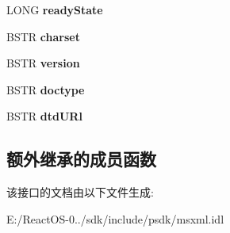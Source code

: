 \begin{DoxyCompactItemize}
L\+O\+NG {\bfseries ready\+State}
\item 
\mbox{\label{interface_m_s_x_m_l_1_1_i_x_m_l_document_a7550babe7d52c2520d53f46e83e7cd21}} 
B\+S\+TR {\bfseries charset}
\item 
\mbox{\label{interface_m_s_x_m_l_1_1_i_x_m_l_document_a944b38dd1867538e5f9d8aded8b349e1}} 
B\+S\+TR {\bfseries version}
\item 
\mbox{\label{interface_m_s_x_m_l_1_1_i_x_m_l_document_ace7ecc9c0bf769b0cdf8c7e65481d55e}} 
B\+S\+TR {\bfseries doctype}
\item 
\mbox{\label{interface_m_s_x_m_l_1_1_i_x_m_l_document_a328275c2005a9c1605942c3b06ebec0b}} 
B\+S\+TR {\bfseries dtd\+U\+Rl}
\end{DoxyCompactItemize}
\subsection*{额外继承的成员函数}


该接口的文档由以下文件生成\+:\begin{DoxyCompactItemize}
\item 
E\+:/\+React\+O\+S-\/0../sdk/include/psdk/msxml.\+idl\end{DoxyCompactItemize}
